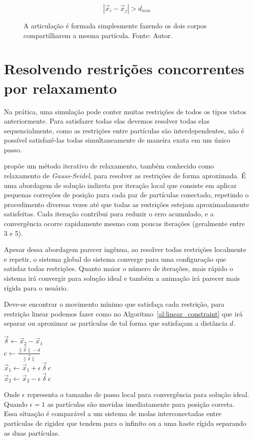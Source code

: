 $$|\vec x_i - \vec x_j| > d_{min}$$ 

\begin{figure}[htb]
	\centering
	
	\caption{A articulação é formada simplesmente fazendo os dois corpos compartilharem a mesma partícula. Fonte: Autor.}
	\label{fig:restricao-articulacao}
\end{figure}

\section{Resolvendo restrições concorrentes por relaxamento}

Na prática, uma simulação pode conter muitas restrições de todos os tipos vistos anteriormente. Para satisfazer todas elas devemos resolver todas elas sequencialmente, como as restrições entre partículas são interdependentes, não é possível satisfazê-las todas simultaneamente de maneira exata em um único passo.

 propõe um método iterativo de relaxamento, também conhecido como relaxamento de \textit{Gauss-Seidel}, para resolver as restrições de forma aproximada. É uma abordagem de solução indireta por iteração local que consiste em aplicar pequenas correções de posição para cada par de partículas conectado, repetindo o procedimento diversas vezes até que todas as restrições estejam aproximadamente satisfeitas. Cada iteração contribui para reduzir o erro acumulado, e a convergência ocorre rapidamente mesmo com poucas iterações (geralmente entre 3 e 5).

Apesar dessa abordagem parecer ingênua, ao resolver todas restrições localmente e repetir, o sistema global do sistema converge para uma configuração que satisfaz todas restrições. Quanto maior o número de iterações, mais rápido o sistema irá convergir para solução ideal e também a animação irá parecer mais rígida para o usuário.

Deve-se encontrar o movimento mínimo que satisfaça cada restrição, para restrição linear podemos fazer como no Algoritmo~\ref{al:linear_constraint} que irá separar ou aproximar as partículas de tal forma que satisfaçam a distância $d$.
\begin{algorithm}[htb]
	\caption{Relaxamento para restrição linear}
	$\vec{\delta} \leftarrow \vec x_2 - \vec x_1$ \\
	$c \leftarrow \frac{\|\vec{\delta}\| - d}{\|\vec{\delta}\|}$ \\
	$\vec x_1 \leftarrow \vec x_1 + \epsilon \, \vec{\delta} \, c$ \\
	$\vec x_2 \leftarrow \vec x_2 - \epsilon \, \vec{\delta} \, c$
	\label{al:linear_constraint}
\end{algorithm}
Onde $\epsilon$ representa o tamanho de passo local para convergência para solução ideal. Quando $\epsilon=1$ as partículas são movidas imediatamente para posição correta. Essa situação é comparável a um sistema de molas interconectadas entre partículas de rigidez que tendem para o infinito ou a uma haste rígida separando as duas partículas. 

